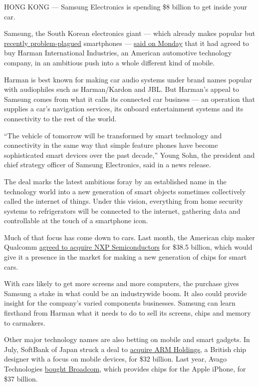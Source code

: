 HONG KONG --- Samsung Electronics is spending \$8 billion to get inside
your car.

Samsung, the South Korean electronics giant --- which already makes
popular but
\href{http://www.nytimes3xbfgragh.onion/2016/10/12/business/international/samsung-galaxy-note7-terminated.html}{recently
problem-plagued} smartphones ---
\href{https://news.samsung.com/global/samsung-electronics-to-acquire-harman-accelerating-growth-in-automotive-and-connected-technologies}{said
on Monday} that it had agreed to buy Harman International Industries, an
American automotive technology company, in an ambitious push into a
whole different kind of mobile.

Harman is best known for making car audio systems under brand names
popular with audiophiles such as Harman/Kardon and JBL. But Harman's
appeal to Samsung comes from what it calls its connected car business
--- an operation that supplies a car's navigation services, its onboard
entertainment systems and its connectivity to the rest of the world.

``The vehicle of tomorrow will be transformed by smart technology and
connectivity in the same way that simple feature phones have become
sophisticated smart devices over the past decade,'' Young Sohn, the
president and chief strategy officer of Samsung Electronics, said in a
news release.

The deal marks the latest ambitious foray by an established name in the
technology world into a new generation of smart objects sometimes
collectively called the internet of things. Under this vision,
everything from home security systems to refrigerators will be connected
to the internet, gathering data and controllable at the touch of a
smartphone icon.

Much of that focus has come down to cars. Last month, the American chip
maker Qualcomm
\href{http://www.nytimes3xbfgragh.onion/2016/10/28/business/dealbook/qualcomm-acquire-nxp-semiconductors.html}{agreed
to acquire NXP Semiconductors} for \$38.5 billion, which would give it a
presence in the market for making a new generation of chips for smart
cars.

With cars likely to get more screens and more computers, the purchase
gives Samsung a stake in what could be an industrywide boom. It also
could provide insight for the company's varied components businesses.
Samsung can learn firsthand from Harman what it needs to do to sell its
screens, chips and memory to carmakers.

Other major technology names are also betting on mobile and smart
gadgets. In July, SoftBank of Japan struck a deal to
\href{http://www.nytimes3xbfgragh.onion/2016/07/19/business/dealbook/softbank-buys-chip-designer-arm.html}{acquire
ARM Holdings}, a British chip designer with a focus on mobile devices,
for \$32 billion. Last year, Avago Technologies
\href{http://www.nytimes3xbfgragh.onion/2015/05/29/business/dealbook/avago-agrees-to-acquire-broadcom-for-37-billion.html}{bought
Broadcom}, which provides chips for the Apple iPhone, for \$37 billion.

